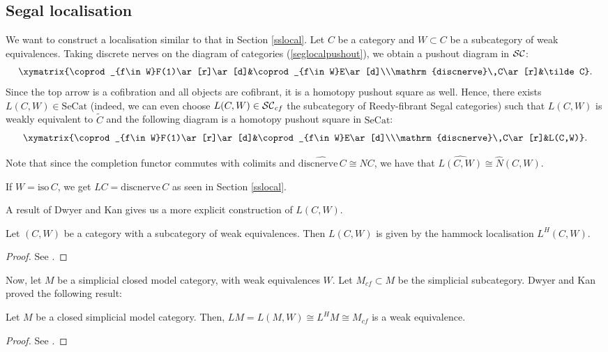 \subsection{Segal localisation}
We want to construct a localisation similar to that in Section \ref{sslocal}. Let $C$ be a category and $W\subset C$ be a subcategory of weak equivalences. Taking discrete nerves on the diagram of categories (\ref{seglocalpushout}), we obtain a pushout diagram in ${\cal SC}$:
$$\xymatrix{\coprod_{f\in W}F(1)\ar[r]\ar[d]&\coprod_{f\in W}E\ar[d]\\\mathrm{discnerve}\,C\ar[r]&\tilde C}.$$
Since the top arrow is a cofibration and all objects are cofibrant, it is a homotopy pushout square as well. Hence, there exists $L(C,W)\in\mathrm{SeCat}$ (indeed, we can even choose $L(C,W)\in{\cal SC}_{cf}$ the subcategory of Reedy-fibrant Segal categories) such that $L(C,W)$ is weakly equivalent to $\tilde C$ and the following diagram is a homotopy pushout square in $\mathrm{SeCat}$:
$$\xymatrix{\coprod_{f\in W}F(1)\ar[r]\ar[d]&\coprod_{f\in W}E\ar[d]\\\mathrm{discnerve}\,C\ar[r]&L(C,W)}.$$

Note that since the completion functor commutes with colimits and $\widehat{\mathrm{discnerve}\,C}\cong NC$, we have that $\widehat{L(C,W)}\cong\hat N(C,W)$.

If $W=\mathrm{iso}\,C$, we get $LC=\mathrm{discnerve}\,C$ as seen in Section \ref{sslocal}.

A result of Dwyer and Kan gives us a more explicit construction of $L(C,W)$.

\begin{thm}
Let $(C,W)$ be a category with a subcategory of weak equivalences. Then $L(C,W)$ is given by the hammock localisation $L^H(C,W)$.
\end{thm}
\begin{proof}
See \cite{dkcomputing}.
\end{proof}

Now, let $M$ be a simplicial closed model category, with weak equivalences $W$. Let $M_{cf}\subset M$ be the simplicial subcategory. Dwyer and Kan proved the following result:

\begin{thm}
Let $M$ be a closed simplicial model category. Then, $LM=L(M,W)\cong L^HM\cong M_{cf}$ is a weak equivalence.
\end{thm}
\begin{proof}
See \cite{dkfunction}.
\end{proof}

